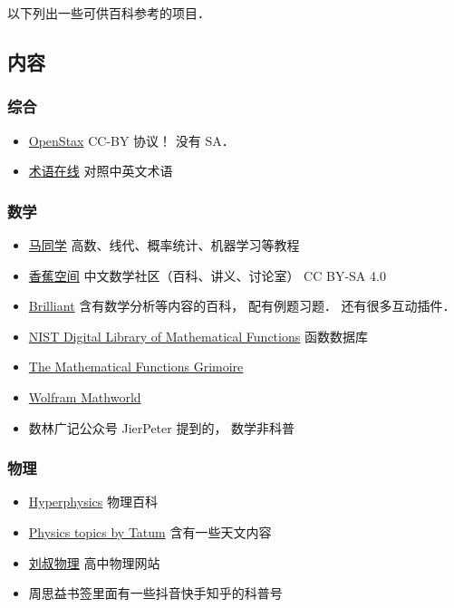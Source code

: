 
以下列出一些可供百科参考的项目．

\subsection{内容}
\subsubsection{综合}
\begin{itemize}
\item \href{https://openstax.org/}{OpenStax} CC-BY 协议！ 没有 SA．
\item \href{https://www.termonline.cn/index}{术语在线} 对照中英文术语
\end{itemize}
\subsubsection{数学}
\begin{itemize}
\item \href{https://www.matongxue.com/}{马同学} 高数、线代、概率统计、机器学习等教程
\item \href{https://www.bananaspace.org/wiki/}{香蕉空间} 中文数学社区（百科、讲义、讨论室） CC BY-SA 4.0
\item \href{https://brilliant.org/}{Brilliant} 含有数学分析等内容的百科， 配有例题习题． 还有很多互动插件．
\item \href{https://dlmf.nist.gov/}{NIST Digital Library of Mathematical Functions} 函数数据库
\item \href{https://fungrim.org/}{The Mathematical Functions Grimoire}
\item \href{https://mathworld.wolfram.com/}{Wolfram Mathworld}
\item 数林广记公众号 JierPeter 提到的， 数学非科普
\end{itemize}
\subsubsection{物理}
\begin{itemize}
\item \href{http://hyperphysics.phy-astr.gsu.edu/}{Hyperphysics} 物理百科
\item \href{http://www.astro.uvic.ca/~tatum/index.php}{Physics topics by Tatum} 含有一些天文内容
\item \href{http://www.myliushu.com/}{刘叔物理} 高中物理网站
\item 周思益书签里面有一些抖音快手知乎的科普号
\end{itemize}
